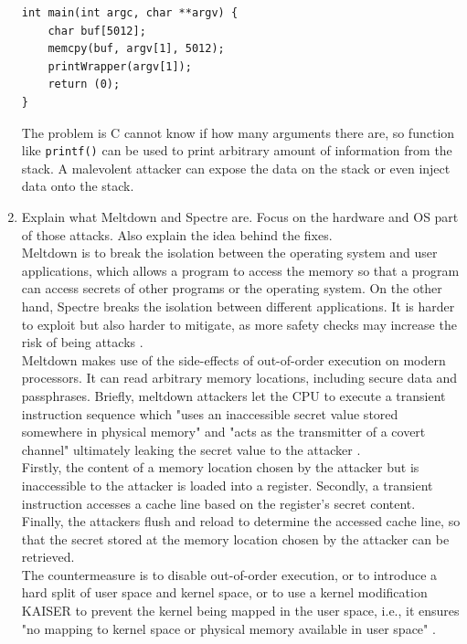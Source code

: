\documentclass[a4paper]{article}
\begin{document}
\begin{enumerate}
\begin{verbatim}
int main(int argc, char **argv) {
    char buf[5012];
    memcpy(buf, argv[1], 5012);
    printWrapper(argv[1]);
    return (0);
}
    \end{verbatim}
    The problem is C cannot know if how many arguments there are, so function like \texttt{printf()} can be used to print arbitrary amount of information from the stack. A malevolent attacker can expose the data on the stack or even inject data onto the stack.
    \item Explain what Meltdown and Spectre are. Focus on the hardware and OS part of those attacks. Also explain the idea behind the fixes.\\
    Meltdown is to break the isolation between the operating system and user applications, which allows a program to access the memory so that a program can access secrets of other programs or the operating system. On the other hand, Spectre breaks the isolation between different applications. It is harder to exploit but also harder to mitigate, as more safety checks may increase the risk of being attacks \cite{meltdownattack}.\\
    Meltdown makes use of the side-effects of out-of-order execution on modern processors. It can read arbitrary memory locations, including secure data and passphrases. Briefly, meltdown attackers let the CPU to execute a transient instruction sequence which "uses an inaccessible secret value stored somewhere in physical memory" and "acts as the transmitter of a covert channel" ultimately leaking the secret value to the attacker \cite{Lipp2018meltdown}.\\
    Firstly, the content of a memory location chosen by the attacker but is inaccessible to the attacker is loaded into a register. Secondly, a transient instruction accesses a cache line based on the register's secret content. Finally, the attackers flush and reload to determine the accessed cache line, so that the secret stored at the memory location chosen by the attacker can be retrieved.\\
    The countermeasure is to disable out-of-order execution, or to introduce a hard split of user space and kernel space, or to use a kernel modification KAISER to prevent the kernel being mapped in the user space, i.e., it ensures "no mapping to kernel space or physical memory available in user space" \cite{Lipp2018meltdown}.
    \begin{figure}[H]
        \centering

\end{figure}
\end{enumerate}
\end{document}
